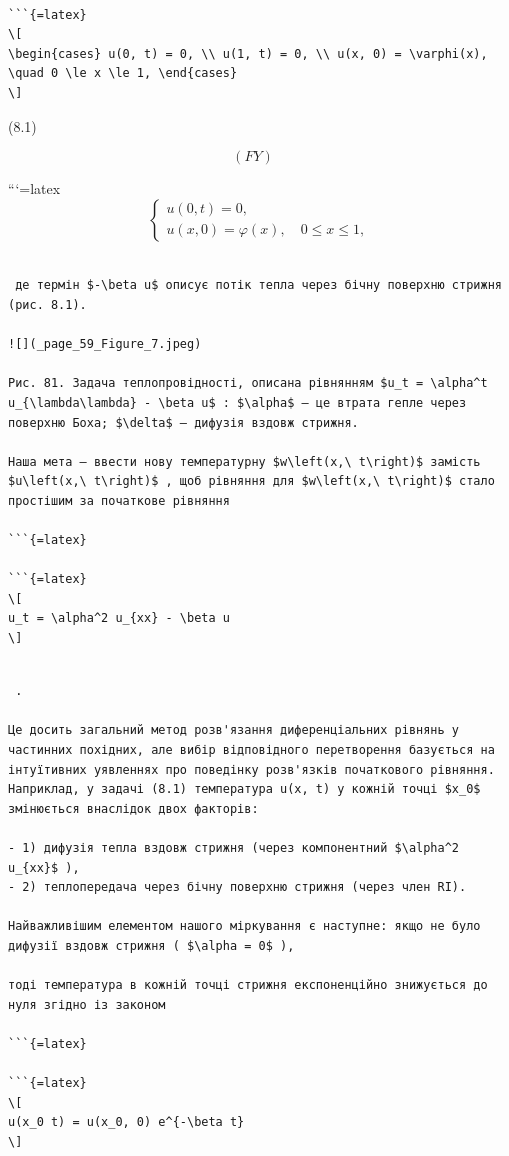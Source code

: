 \documentclass[
  ukrainian,
]{article}
\begin{document}
\begin{verbatim}

```{=latex}
\[
\begin{cases} u(0, t) = 0, \\ u(1, t) = 0, \\ u(x, 0) = \varphi(x), \quad 0 \le x \le 1, \end{cases}
\]
\end{verbatim}

(8.1)

\[
(FY) \quad
\]

```{=latex}
\[
\begin{cases} u(0, t) = 0, \\ u(x, 0) = \varphi(x), \quad 0 \le x \le 1, \end{cases}
\]

\begin{verbatim}

 де термін $-\beta u$ описує потік тепла через бічну поверхню стрижня (рис. 8.1).

![](_page_59_Figure_7.jpeg)

Рис. 81. Задача теплопровідності, описана рівнянням $u_t = \alpha^t u_{\lambda\lambda} - \beta u$ : $\alpha$ — це втрата гепле через поверхню Боха; $\delta$ – дифузія вздовж стрижня.

Наша мета — ввести нову температурну $w\left(x,\ t\right)$ замість $u\left(x,\ t\right)$ , щоб рівняння для $w\left(x,\ t\right)$ стало простішим за початкове рівняння

```{=latex}

```{=latex}
\[
u_t = \alpha^2 u_{xx} - \beta u
\]
\end{verbatim}

\begin{verbatim}

 .

Це досить загальний метод розв'язання диференціальних рівнянь у частинних похідних, але вибір відповідного перетворення базується на інтуїтивних уявленнях про поведінку розв'язків початкового рівняння. Наприклад, у задачі (8.1) температура u(x, t) у кожній точці $x_0$ змінюється внаслідок двох факторів:

- 1) дифузія тепла вздовж стрижня (через компонентний $\alpha^2 u_{xx}$ ),
- 2) теплопередача через бічну поверхню стрижня (через член RI).

Найважливішим елементом нашого міркування є наступне: якщо не було дифузії вздовж стрижня ( $\alpha = 0$ ),

тоді температура в кожній точці стрижня експоненційно знижується до нуля згідно із законом

```{=latex}

```{=latex}
\[
u(x_0 t) = u(x_0, 0) e^{-\beta t}
\]
\end{verbatim}
\end{document}
